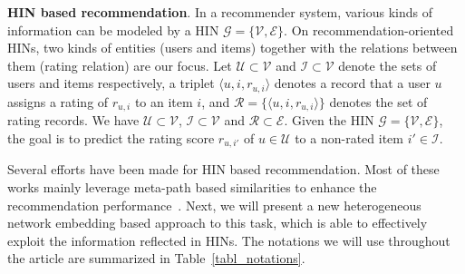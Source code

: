 \begin{myDef}
\textbf{HIN based recommendation}. In a recommender system, various kinds of information can be modeled by a HIN $\mathcal{G} = \{\mathcal{V}, \mathcal{E}\}$. On recommendation-oriented HINs, two kinds of entities (\ie users and items) together with the relations between them (\ie rating relation) are our focus.
Let $\mathcal{U}\subset \mathcal{V}$
and $\mathcal{I}\subset \mathcal{V}$ denote the sets of users and items respectively, a triplet $\langle u, i, r_{u,i}\rangle$  denotes a record that a user $u$ assigns a rating of $r_{u,i}$ to  an item $i$, and $\mathcal{R}=\{\langle u, i, r_{u,i}\rangle\}$ denotes the set of rating records.
We have $\mathcal{U}\subset \mathcal{V}$, $\mathcal{I}\subset \mathcal{V}$ and $\mathcal{R}\subset \mathcal{E}$.
Given the HIN $\mathcal{G} = \{\mathcal{V}, \mathcal{E}\}$, the goal is to predict the rating score $r_{u,i'}$ of $u\in \mathcal{U}$ to a non-rated item $i'\in \mathcal{I}$.
\end{myDef}

Several efforts have been made for HIN based recommendation. Most of these works mainly leverage meta-path based similarities to enhance
the recommendation performance~\cite{yu2013collaborative,yu2014personalized,shi2015semantic,shi2016integrating}. Next, we will present a new heterogeneous network embedding based approach to this task, which is able to effectively
exploit the information reflected in HINs. The notations we will use throughout the article are summarized in Table~\ref{tabl_notations}.

